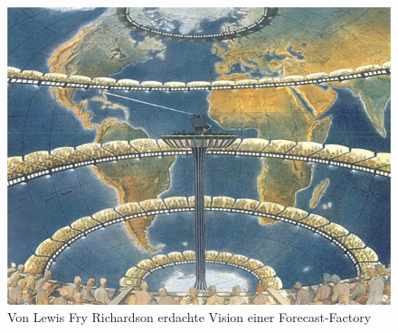 %
%
%
\begin{figure}
\centering
\includegraphics[width=\textwidth]{chapters/000-einleitung/images/forecast-factory-color.jpg}
\caption{Von Lewis Fry Richardson erdachte Vision einer Forecast-Factory
\label{buch:einleitung:fig:factory}}
\end{figure}
